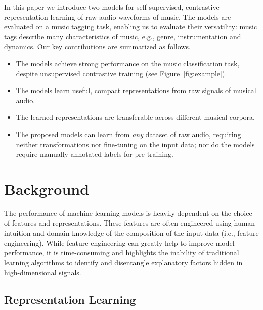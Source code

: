 \documentclass{report}
\begin{document}

In this paper we introduce two models for self-supervised, contrastive representation learning of raw audio waveforms of music. %
The models are evaluated on a music tagging task, enabling us to evaluate their versatility: music tags describe many characteristics of music, e.g., genre, instrumentation and dynamics. Our key contributions are summarized as follows.
\begin{itemize}
    \item The models achieve strong performance on the music classification task, despite unsupervised contrastive training (see Figure~\ref{fig:example}).
    \item The models learn useful, compact representations from raw signals of musical audio.
    \item The learned representations are transferable across different musical corpora.
    \item The proposed models can learn from \emph{any} dataset of raw audio, requiring neither transformations nor fine-tuning on the input data; nor do the models require manually annotated labels for pre-training.
\end{itemize}



\chapter{Background}
The performance of machine learning models is heavily dependent on the choice of features and representations. These features are often engineered using human intuition and domain knowledge of the composition of the input data (i.e., feature engineering). While feature engineering can greatly help to improve model performance, it is time-consuming and highlights the inability of traditional learning algorithms to identify and disentangle explanatory factors hidden in high-dimensional signals. 

\section{Representation Learning}
\end{document}
